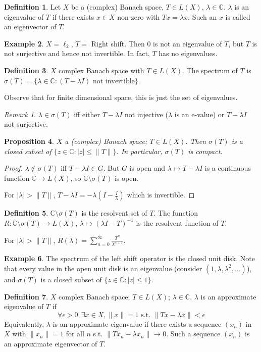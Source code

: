 \documentclass{article}
\theoremstyle{definition}
\newtheorem{defn}{Definition}[section]
\newtheorem{example}[defn]{Example}
\theoremstyle{remark}
\newtheorem{rem}{Remark}
\theoremstyle{plain}
\newtheorem{prop}[defn]{Proposition}
\newcommand{\CC}{\mathbb{C}}
\begin{document}
\begin{defn}
    Let $X$ be a (complex) Banach space, $T\in L(X)$, $\lambda\in \CC$. $\lambda$ is an eigenvalue of $T$ if there exists $x\in X$ non-zero with $Tx=\lambda x$. Such an $x$ is called an eigenvector of $T$.
\end{defn}
\begin{example}
    $X=\ell_2$, $T=$ Right shift. Then $0$ is not an eigenvalue of $T$, but $T$ is not surjective and hence not invertible. In fact, $T$ has no eigenvalues.
\end{example}
\begin{defn}
    $X$ complex Banach space with $T\in L(X)$. The spectrum of $T$ is $\sigma(T)=\{\lambda\in \CC:(T-\lambda I)\text{ not invertible}\}$.
\end{defn}
Observe that for finite dimensional space, this is just the set of eigenvalues.
\begin{rem}
    $\lambda\in\sigma(T)$ iff either $T-\lambda I$ not injective ($\lambda$ is an e-value) or $T-\lambda I$ not surjective.
\end{rem}
\begin{prop}
    $X$ a (complex) Banach space; $T\in L(X)$. Then $\sigma(T)$ is a closed subset of $\{z\in\CC: |z|\le \|T\|\}$. In particular, $\sigma(T)$ is compact.
\end{prop}
\begin{proof}
    $\lambda\notin \sigma(T)$ iff $T-\lambda I\in G$. But $G$ is open and $\lambda\mapsto T-\lambda I$ is a continuous function $\CC\to L(X)$, so $\CC\setminus \sigma(T)$ is open.

    For $|\lambda|>\|T\|$, $T-\lambda I=-\lambda (I-\frac{I}{\lambda})$ which is invertible.
\end{proof}
\begin{defn}
    $\CC\setminus\sigma(T)$ is the resolvent set of $T$. The function $R:\CC\setminus\sigma(T)\to L(X)$, $\lambda\mapsto (\lambda I-T)^{-1}$ is the resolvent function of $T$.
\end{defn}
For $|\lambda |>\|T\|$, $R(\lambda)=\sum_{n=0}^\infty \frac{T^n}{\lambda^{n+1}}$.
\begin{example}
    The spectrum of the left shift operator is the closed unit disk. Note that every value in the open unit disk is an eigenvalue (consider $(1,\lambda,\lambda^2,...)$), and $\sigma(T)$ is a closed subset of $\{z\in \CC:|z|\le 1\}$.
\end{example}
\begin{defn}
    $X$ complex Banach space; $T\in L(X)$; $\lambda\in\CC$. $\lambda$ is an approximate eigenvalue of $T$ if 
    \[\forall\epsilon>0,\exists x\in X, \|x\|=1\text{ s.t. }\|Tx-\lambda x\|<\epsilon\]
    Equivalently, $\lambda$ is an approximate eigenvalue if there exists a sequence $(x_n)$ in $X$ with $\|x_n\|=1$ for all $n$ s.t. $\|Tx_n-\lambda x_n\|\to 0$. Such a sequence $(x_n)$ is an approximate eigenvector of $T$.
\end{defn}
\end{document}
